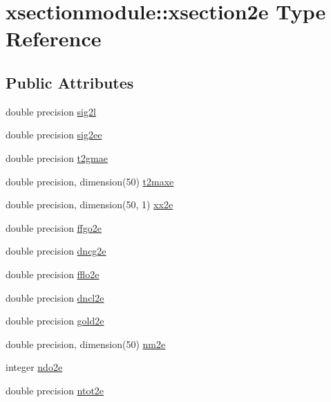 \hypertarget{structxsectionmodule_1_1xsection2e}{}\section{xsectionmodule\+:\+:xsection2e Type Reference}
\label{structxsectionmodule_1_1xsection2e}
\subsection*{Public Attributes}
\begin{DoxyCompactItemize}
\item 
double precision \hyperlink{structxsectionmodule_1_1xsection2e_a28c91f917ce72984e0a1748d855070fd}{sig2l}
\item 
double precision \hyperlink{structxsectionmodule_1_1xsection2e_ad877e60132fe8d031c902dc802ce8bca}{sig2ee}
\item 
double precision \hyperlink{structxsectionmodule_1_1xsection2e_a9814bf76b5236e7eac6083be39f749e2}{t2gmae}
\item 
double precision, dimension(50) \hyperlink{structxsectionmodule_1_1xsection2e_aeff16d0efeb0ea2455d947cf854663ec}{t2maxe}
\item 
double precision, dimension(50, 1) \hyperlink{structxsectionmodule_1_1xsection2e_a2462144f551e80966964150190bcd213}{xx2e}
\item 
double precision \hyperlink{structxsectionmodule_1_1xsection2e_aa9e29b7a1129aa9068161deb09659440}{ffgo2e}
\item 
double precision \hyperlink{structxsectionmodule_1_1xsection2e_a8d6077bb1576febe82ce67d81d5676c5}{dncg2e}
\item 
double precision \hyperlink{structxsectionmodule_1_1xsection2e_a56ebc1bd3eda382b8982ccd7586f3bdf}{fflo2e}
\item 
double precision \hyperlink{structxsectionmodule_1_1xsection2e_adbb9e7db96c45b19ca9de2ae0d792db8}{dncl2e}
\item 
double precision \hyperlink{structxsectionmodule_1_1xsection2e_aad40e59802a9c8171e2396d1679a9d49}{gold2e}
\item 
double precision, dimension(50) \hyperlink{structxsectionmodule_1_1xsection2e_ac1ec0d907dbd8f8e03380525d0ec1936}{nm2e}
\item 
integer \hyperlink{structxsectionmodule_1_1xsection2e_abd9b871f427d3e0439ae16bfc12c7a15}{ndo2e}
\item 
double precision \hyperlink{structxsectionmodule_1_1xsection2e_ad6048ce6affbdfb65cc3ff891b4741a5}{ntot2e}

\end{DoxyCompactItemize}

